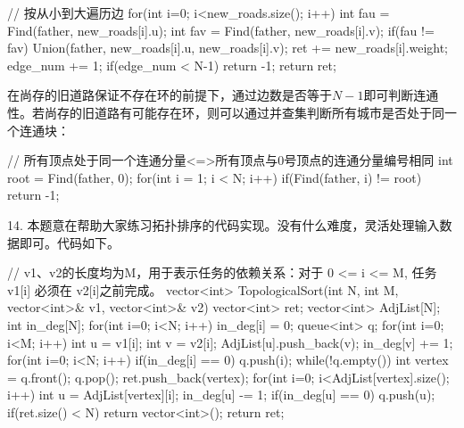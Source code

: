 \begin{exerciseanswer}
\begin{cppcode}
{        // 按从小到大遍历边
        for(int i=0; i<new_roads.size(); i++) {
            int fau = Find(father, new_roads[i].u);
            int fav = Find(father, new_roads[i].v);
            if(fau != fav) {
                Union(father, new_roads[i].u, new_roads[i].v);
                ret += new_roads[i].weight;
                edge_num += 1;
            }
        }
        if(edge_num < N-1) {
            return -1;
        }
        return ret;

    }
\end{cppcode}
在尚存的旧道路保证不存在环的前提下，通过边数是否等于$N-1$即可判断连通性。若尚存的旧道路有可能存在环，则可以通过并查集判断所有城市是否处于同一个连通块：
\begin{cppcode}
    // 所有顶点处于同一个连通分量<=>所有顶点与0号顶点的连通分量编号相同
    int root = Find(father, 0);
    for(int i = 1; i < N; i++) {
        if(Find(father, i) != root) {
            return -1;
        }
    }
\end{cppcode}

\vspace{\baselineskip}

14. 本题意在帮助大家练习拓扑排序的代码实现。没有什么难度，灵活处理输入数据即可。代码如下。
\begin{cppcode}
    // v1、v2的长度均为M，用于表示任务的依赖关系：对于 0 <= i <= M, 任务 v1[i] 必须在 v2[i]之前完成。
    vector<int> TopologicalSort(int N, int M, vector<int>& v1, vector<int>& v2) {
        vector<int> ret;
        vector<int> AdjList[N];
        int in_deg[N];
        for(int i=0; i<N; i++) {
            in_deg[i] = 0;
        }
        queue<int> q;
        for(int i=0; i<M; i++) {
            int u = v1[i];
            int v = v2[i];
            AdjList[u].push_back(v);
            in_deg[v] += 1;
        }
        for(int i=0; i<N; i++) {
            if(in_deg[i] == 0) {
                q.push(i);
            }
        }
        while(!q.empty()) {
            int vertex = q.front();
            q.pop();
            ret.push_back(vertex);
            for(int i=0; i<AdjList[vertex].size(); i++) {
                int u = AdjList[vertex][i];
                in_deg[u] -= 1;
                if(in_deg[u] == 0) {
                    q.push(u);
                }
            }
        }
        if(ret.size() < N) {
            return vector<int>();
        }
        return ret;
    }
\end{cppcode}

\vspace{\baselineskip}


\end{exerciseanswer}
